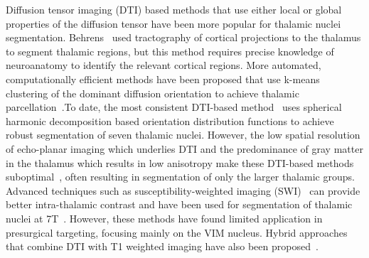Diffusion tensor imaging (DTI) based methods that use either local or global properties of the diffusion tensor have been more popular for thalamic nuclei segmentation. Behrens~\cite{behrens_Noninvasive_2003} used tractography of cortical projections to the thalamus to segment thalamic regions, but this method requires precise knowledge of neuroanatomy to identify the relevant cortical regions. More automated, computationally efficient methods have been proposed that use k-means clustering of the dominant diffusion orientation to achieve thalamic parcellation~\cite{wiegell_Automatic_2003,kumar_Direct_2015,mang_Thalamus_2012}.To date, the most consistent DTI-based method~\cite{battistella_Robust_2017} uses spherical harmonic decomposition based orientation distribution functions to achieve robust segmentation of seven thalamic nuclei. However, the low spatial resolution of echo-planar imaging which underlies DTI and the predominance of gray matter in the thalamus which results in low anisotropy make these DTI-based methods suboptimal~\cite{su_Thalamus_2019}, often resulting in segmentation of only the larger thalamic groups. Advanced techniques such as susceptibility-weighted imaging (SWI)~\cite{haacke_Susceptibility_2004} can provide better intra-thalamic contrast and have been used for segmentation of thalamic nuclei at 7T~\cite{ abosch_Assessment_2010, xiao_Multimodal_2016}. However, these methods have found limited application in presurgical targeting, focusing mainly on the VIM nucleus. Hybrid approaches that combine DTI with T1 weighted imaging have also been proposed~\cite{glaister_Thalamus_2017,stough_Thalamic_2013}.

